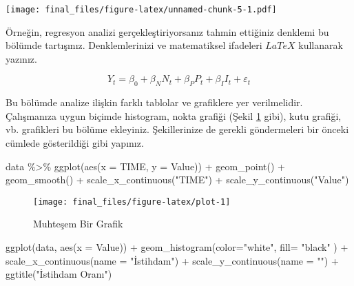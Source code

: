 \documentclass[
  12pt,
]{article}
\newenvironment{Shaded}{\begin{snugshade}}{\end{snugshade}}
\newcommand{\AttributeTok}[1]{\textcolor[rgb]{0.77,0.63,0.00}{#1}}
\newcommand{\FunctionTok}[1]{\textcolor[rgb]{0.00,0.00,0.00}{#1}}
\newcommand{\NormalTok}[1]{#1}
\newcommand{\SpecialCharTok}[1]{\textcolor[rgb]{0.00,0.00,0.00}{#1}}
\newcommand{\StringTok}[1]{\textcolor[rgb]{0.31,0.60,0.02}{#1}}
\begin{document}
\texttt{[image: final\_files/figure-latex/unnamed-chunk-5-1.pdf]}

Örneğin, regresyon analizi gerçekleştiriyorsanız tahmin ettiğiniz denklemi bu bölümde tartışınız. Denklemlerinizi ve matematiksel ifadeleri \(LaTeX\) kullanarak yazınız.

\[
Y_t = \beta_0 + \beta_N N_t + \beta_P P_t + \beta_I I_t + \varepsilon_t
\]

Bu bölümde analize ilişkin farklı tablolar ve grafiklere yer verilmelidir. Çalışmanıza uygun biçimde histogram, nokta grafiği (Şekil \ref{fig:plot} gibi), kutu grafiği, vb. grafikleri bu bölüme ekleyiniz. Şekillerinize de gerekli göndermeleri bir önceki cümlede gösterildiği gibi yapınız.

\begin{Shaded}
\begin{Highlighting}[]
\NormalTok{data }\SpecialCharTok{\%\textgreater{}\%} 
  \FunctionTok{ggplot}\NormalTok{(}\FunctionTok{aes}\NormalTok{(}\AttributeTok{x =}\NormalTok{ TIME, }\AttributeTok{y =}\NormalTok{ Value)) }\SpecialCharTok{+}
  \FunctionTok{geom\_point}\NormalTok{() }\SpecialCharTok{+}
  \FunctionTok{geom\_smooth}\NormalTok{() }\SpecialCharTok{+}
  \FunctionTok{scale\_x\_continuous}\NormalTok{(}\StringTok{"TIME"}\NormalTok{) }\SpecialCharTok{+} 
  \FunctionTok{scale\_y\_continuous}\NormalTok{(}\StringTok{"Value"}\NormalTok{)}
\end{Highlighting}
\end{Shaded}

\begin{figure}

{\centering \texttt{[image: final\_files/figure-latex/plot-1]} 

}

\caption{Muhteşem Bir Grafik}\label{fig:plot}
\end{figure}

\begin{Shaded}
\begin{Highlighting}[]
\FunctionTok{ggplot}\NormalTok{(data, }\FunctionTok{aes}\NormalTok{(}\AttributeTok{x =}\NormalTok{ Value)) }\SpecialCharTok{+}
  \FunctionTok{geom\_histogram}\NormalTok{(}\AttributeTok{color=}\StringTok{"white"}\NormalTok{,}
                \AttributeTok{fill=} \StringTok{"black"}\NormalTok{ ) }\SpecialCharTok{+}
  \FunctionTok{scale\_x\_continuous}\NormalTok{(}\AttributeTok{name =} \StringTok{"İstihdam"}\NormalTok{) }\SpecialCharTok{+}
  \FunctionTok{scale\_y\_continuous}\NormalTok{(}\AttributeTok{name =} \StringTok{""}\NormalTok{) }\SpecialCharTok{+}
  \FunctionTok{ggtitle}\NormalTok{(}\StringTok{"İstihdam Oranı"}\NormalTok{)}
\end{Highlighting}
\end{Shaded}
\end{document}
